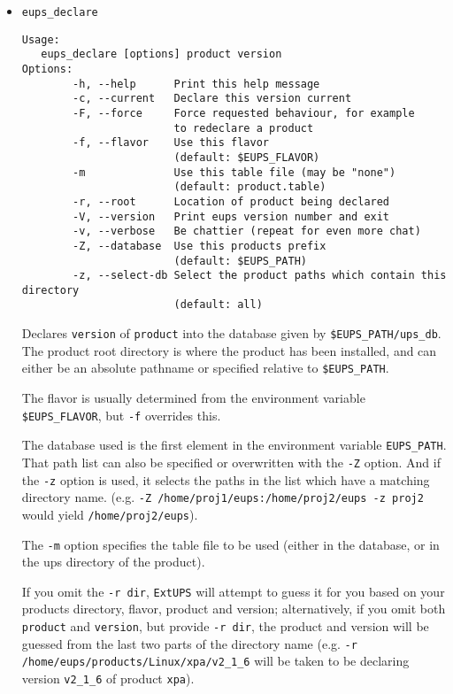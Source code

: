 \documentclass{article}
\newcommand{\code}[1]{\texttt{#1}}
\newcommand{\eups}{\code{ExtUPS}}
\begin{document}
\begin{itemize}


\item \code{eups\_declare}
\begin{verbatim}
Usage:
   eups_declare [options] product version
Options:
        -h, --help      Print this help message
        -c, --current   Declare this version current
        -F, --force     Force requested behaviour, for example
                        to redeclare a product
        -f, --flavor    Use this flavor
                        (default: $EUPS_FLAVOR)
        -m              Use this table file (may be "none")
                        (default: product.table)
        -r, --root      Location of product being declared
        -V, --version   Print eups version number and exit
        -v, --verbose   Be chattier (repeat for even more chat)
        -Z, --database  Use this products prefix
                        (default: $EUPS_PATH)
        -z, --select-db Select the product paths which contain this directory 
                        (default: all)
\end{verbatim}

Declares \code{version} of \code{product} into the database given by \code{\$EUPS\_PATH/ups\_db}.
The product root directory is where the product has been installed, and can either
be an absolute pathname or specified relative to \code{\$EUPS\_PATH}.

The flavor is usually determined from the
environment variable \code{\$EUPS\_FLAVOR}, but \code{-f}
overrides this. 

The database used is the first element in the environment
variable \code{EUPS\_PATH}. That path list can also be specified or
overwritten with the \code{-Z} option. And if the \code{-z} option is
used, it selects the paths in the list which have a matching directory
name. (e.g. \code{-Z /home/proj1/eups:/home/proj2/eups -z proj2} would
yield \code{/home/proj2/eups}).

The \code{-m} option specifies the table
file to be used (either in the database, or in the ups directory of the product).

If you omit the \code{-r dir}, \eups{} will attempt to guess it for you based
on your products directory, flavor, product and version; alternatively,
if you omit both \code{product} and \code{version}, but provide \code{-r dir},
the product and version will be guessed from the last two parts of the directory
name (e.g. \code{-r /home/eups/products/Linux/xpa/v2\_1\_6} will be taken to be
declaring version \code{v2\_1\_6} of product \code{xpa}).


\end{itemize}
\end{document}
